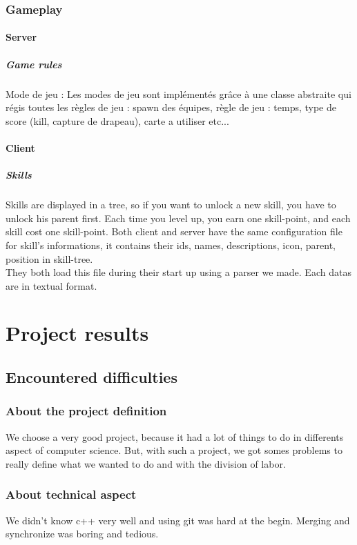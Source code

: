 \documentclass{scrreprt}
\begin{document}
					\section{Gameplay}
					\subsection{Server}
					\subsubsection{Game rules}
					Mode de jeu :
					Les modes de jeu sont implémentés grâce à une classe abstraite qui régis toutes les règles de jeu : spawn des équipes, règle de jeu : temps, type de score (kill, capture de drapeau), carte a utiliser etc...
					\subsection{Client}
					\subsubsection{Skills}
					Skills are displayed in a tree, so if you want to unlock a new skill, you have to unlock his parent first. Each time you level up, you earn one skill-point, and each skill cost one skill-point. Both client and server have the same configuration file for skill's informations, it contains their ids, names, descriptions, icon, parent, position in skill-tree.\\

					They both load this file during their start up using a parser we made. Each datas are in textual format. 		

					\part{Project results}
					\chapter{Encountered difficulties}
					\section{About the project definition}
					We choose a very good project, because it had a lot of things to do in differents aspect of computer science. But, with such a project, we got somes problems to really define what we wanted to do and with the division of labor.
					\section{About technical aspect}
					We didn't know c++ very well and using git was hard at the begin. Merging and synchronize was boring and tedious.
\end{document}
